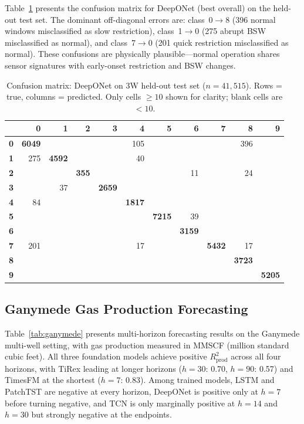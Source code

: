 \documentclass[conference]{IEEEtran}
\begin{document}
Table~\ref{tab:confusion} presents the confusion matrix for DeepONet (best overall) on the held-out test set. The dominant off-diagonal errors are: class~0$\to$8 (396 normal windows misclassified as slow restriction), class~1$\to$0 (275 abrupt BSW misclassified as normal), and class~7$\to$0 (201 quick restriction misclassified as normal). These confusions are physically plausible---normal operation shares sensor signatures with early-onset restriction and BSW changes.

\begin{table}[t]
\centering
\caption{Confusion matrix: DeepONet on 3W held-out test set ($n{=}41{,}515$). Rows = true, columns = predicted. Only cells $\geq 10$ shown for clarity; blank cells are $< 10$.}
\label{tab:confusion}
\scriptsize
\setlength{\tabcolsep}{2pt}
\begin{tabular}{@{}r|rrrrrrrrrr@{}}
\toprule
 & \textbf{0} & \textbf{1} & \textbf{2} & \textbf{3} & \textbf{4} & \textbf{5} & \textbf{6} & \textbf{7} & \textbf{8} & \textbf{9} \\
\midrule
\textbf{0} & \textbf{6049} &  &  &  & 105 &  &  &  & 396 &  \\
\textbf{1} & 275 & \textbf{4592} &  &  & 40 &  &  &  &  &  \\
\textbf{2} &  &  & \textbf{355} &  &  &  & 11 &  & 24 &  \\
\textbf{3} &  & 37 &  & \textbf{2659} &  &  &  &  &  &  \\
\textbf{4} & 84 &  &  &  & \textbf{1817} &  &  &  &  &  \\
\textbf{5} &  &  &  &  &  & \textbf{7215} & 39 &  &  &  \\
\textbf{6} &  &  &  &  &  &  & \textbf{3159} &  &  &  \\
\textbf{7} & 201 &  &  &  & 17 &  &  & \textbf{5432} & 17 &  \\
\textbf{8} &  &  &  &  &  &  &  &  & \textbf{3723} &  \\
\textbf{9} &  &  &  &  &  &  &  &  &  & \textbf{5205} \\
\bottomrule
\end{tabular}
\end{table}

\subsection{Ganymede Gas Production Forecasting}

Table~\ref{tab:ganymede} presents multi-horizon forecasting results on the Ganymede multi-well setting, with gas production measured in MMSCF (million standard cubic feet). All three foundation models achieve positive $R^2_\text{prod}$ across all four horizons, with TiRex leading at longer horizons ($h{=}30$: 0.70, $h{=}90$: 0.57) and TimesFM at the shortest ($h{=}7$: 0.83). Among trained models, LSTM and PatchTST are negative at every horizon, DeepONet is positive only at $h{=}7$ before turning negative, and TCN is only marginally positive at $h{=}14$ and $h{=}30$ but strongly negative at the endpoints.
\end{document}
